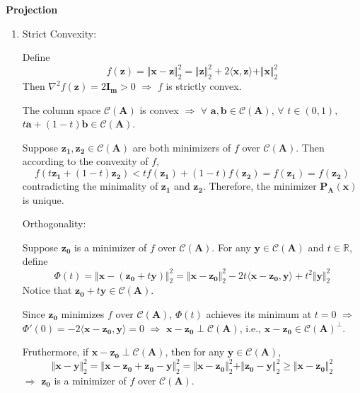 \documentclass[11pt,letter,notitlepage]{article}
\newcommand{\proj}[2]{\textbf{P}_{#2} (#1)}
\theoremstyle{definition}
\begin{document}
\newpage

\begin{solution}\textbf{Projection}
\begin{enumerate}
	\item
	 Strict Convexity:

	Define
	$$f(\mathbf{z}) = \Vert \mathbf{x} - \mathbf{z} \Vert_2^2 = \Vert \mathbf{z} \Vert_2^2 + 2\langle \mathbf{x}, \mathbf{z} \rangle + \Vert \mathbf{x} \Vert_2^2$$
	Then $\nabla^2 f(\mathbf{z}) = 2 \mathbf{I_m} > 0$ $\Longrightarrow$ $f$ is strictly convex. 
	
	The column space $\mathcal{C}(\mathbf{A})$ is convex $\Longrightarrow$ $\forall$ $\mathbf{a}, \mathbf{b} \in \mathcal{C}(\mathbf{A})$, $\forall$ $t \in (0,1)$, $t\mathbf{a} + (1-t)\mathbf{b} \in \mathcal{C}(\mathbf{A})$. 
	
	Suppose $\mathbf{z_1}, \mathbf{z_2} \in \mathcal{C}(\mathbf{A})$ are both minimizers of $f$ over $\mathcal{C}(\mathbf{A})$. Then according to the convexity of $f$,
	\[
	f(t\mathbf{z_1} + (1-t)\mathbf{z_2}) < tf(\mathbf{z_1}) + (1-t)f(\mathbf{z_2}) = f(\mathbf{z_1}) = f(\mathbf{z_2})
	\]
	contradicting the minimality of $\mathbf{z_1}$ and $\mathbf{z_2}$. Therefore, the minimizer $\proj{\mathbf{x}}{\mathbf{A}}$ is unique.

	 Orthogonality:
	
	Suppose $\mathbf{z_0}$ is a minimizer of $f$ over $\mathcal{C}(\mathbf{A})$. For any $\mathbf{y} \in \mathcal{C}(\mathbf{A})$ and $t \in \mathbb{R}$, define
	$$\Phi(t) = \Vert \mathbf{x}-(\mathbf{z_0} + t\mathbf{y}) \Vert_2^2 = \Vert \mathbf{x} - \mathbf{z_0} \Vert_2^2 - 2t\langle\mathbf{x}-\mathbf{z_0}, \mathbf{y}\rangle + t^2 \Vert \mathbf{y} \Vert_2^2$$
	Notice that $\mathbf{z_0} + t\mathbf{y} \in \mathcal{C}(\mathbf{A})$.

	Since $\mathbf{z_0}$ minimizes $f$ over $\mathcal{C}(\mathbf{A})$, $\Phi(t)$ achieves its minimum at $t = 0$ $\Longrightarrow$ $\Phi'(0) = -2 \langle \mathbf{x} - \mathbf{z_0}, \mathbf{y} \rangle = 0$ $\Longrightarrow$ $\mathbf{x} - \mathbf{z_0} \perp \mathcal{C}(\mathbf{A})$, i.e., $\mathbf{x} - \mathbf{z_0} \in \mathcal{C}(\mathbf{A})^{\perp}$.

	Fruthermore, if $\mathbf{x} - \mathbf{z_0} \perp \mathcal{C}(\mathbf{A})$, then for any $\mathbf{y} \in \mathcal{C}(\mathbf{A})$,
	\[
	\Vert \mathbf{x} - \mathbf{y} \Vert_2^2 = \Vert \mathbf{x} - \mathbf{z_0} + \mathbf{z_0} - \mathbf{y} \Vert_2^2 = \Vert \mathbf{x} - \mathbf{z_0} \Vert_2^2 + \Vert \mathbf{z_0} - \mathbf{y} \Vert_2^2 \geq \Vert \mathbf{x} - \mathbf{z_0} \Vert_2^2
	\]
	$\Longrightarrow$ $\mathbf{z_0}$ is a minimizer of $f$ over $\mathcal{C}(\mathbf{A})$.


\end{enumerate}
\end{solution}
\end{document}
